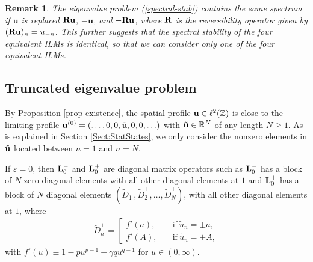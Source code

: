 \documentclass[12pt,reqno]{amsart}
\newtheorem{remark}{Remark}
\begin{document}
\begin{remark}
	The eigenvalue problem (\ref{spectral-stab}) contains the same spectrum 
	if $\mathbf{u}$ is replaced ${\bf R} \mathbf{u}$, $-{\mathbf{u}}$, and $-{\bf R} \mathbf{u}$, where ${\bf R}$ is the reversibility operator given by $({\bf R u})_n = u_{-n}$. This further suggests that the spectral stability of the four equivalent ILMs is identical, so that we can consider only one of the four equivalent ILMs.
\end{remark}


\subsection{Truncated eigenvalue problem}
\label{Sec:StabilityACLGen}

By Proposition \ref{prop-existence}, the spatial profile ${\bf u} \in \ell^2(\mathbb{Z})$ is close to the limiting profile ${\bf u}^{(0)} = (\ldots,0,0,\tilde{\bf u},0,0,\ldots)$ with $\tilde{\bf u} \in \mathbb{R}^N$ 
of any length $N \geq 1$. As is explained in Section \ref{Sect:StatStates}, we only consider the nonzero elements in $\tilde{\bf u}$ located between $n = 1$ and $n = N$.

If $\varepsilon=0$, then ${\bf L}^-_0$ and ${\bf L}^+_0$ are diagonal matrix operators such as ${\bf L}^-_0$ has a block of $N$ zero diagonal elements with all other diagonal elements at $1$ and  ${\bf L}^+_0$ has a block of $N$ diagonal elements $(\tilde{D}_1^+,\tilde{D}_2^+,\ldots,\tilde{D}_N^+)$, with all other diagonal elements at $1$, where 
\begin{gather}
\tilde{D}_n^+=\left[
\begin{array}{ll}
f'(a),& \quad \mbox{if}~\tilde{u}_n=\pm a,\\ [2mm]
f'(A),&\quad \mbox{if}~\tilde{u}_n=\pm A,
\end{array}
\right.
\label{Eq:D_n^+}
\end{gather}
with $f'(u) \equiv 1- p u^{p-1} +\gamma q u^{q-1}$ for $u \in (0,\infty)$.
\end{document}

